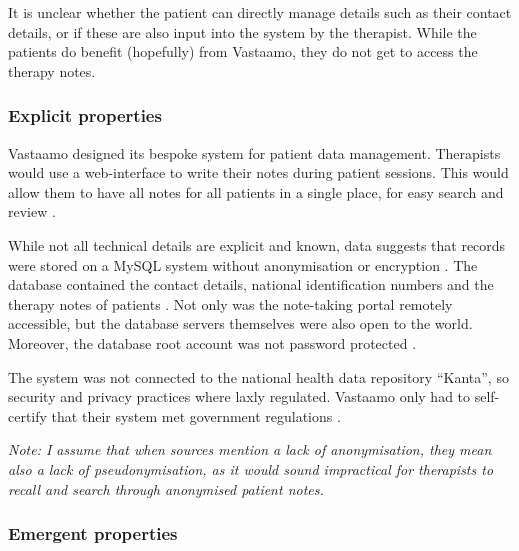 \documentclass[parskip=half]{scrartcl}
\begin{document}
It is unclear whether the patient can directly manage details such as their
contact details, or if these are also input into the system by the therapist.
While the patients do benefit (hopefully) from Vastaamo, they do not get to
access the therapy notes.

\subsubsection*{Explicit properties}


Vastaamo designed its bespoke system for patient data management. Therapists
would use a web-interface to write their notes during patient sessions. This
would allow them to have all notes for all patients in a single place, for easy
search and review \cite{wired1}.

While not all technical details are explicit and known, data suggests that
records were stored on a MySQL system without anonymisation or encryption
\cite{wired1}. The database contained the contact details, national
identification numbers and the therapy notes of patients \cite{berggren}. Not
only was the note-taking portal remotely accessible, but the database servers
themselves were also open to the world. Moreover, the database root account was
not password protected \cite{ombudsman}.

The system was not connected to the national health data repository ``Kanta'',
so security and privacy practices where laxly regulated. Vastaamo only had to
self-certify that their system met government regulations \cite{wired1}.

\textit{Note: I assume that when sources mention a lack of anonymisation, they
mean also a lack of pseudonymisation, as it would sound impractical for
therapists to recall and search through anonymised patient notes.}

\subsubsection*{Emergent properties}

\end{document}
